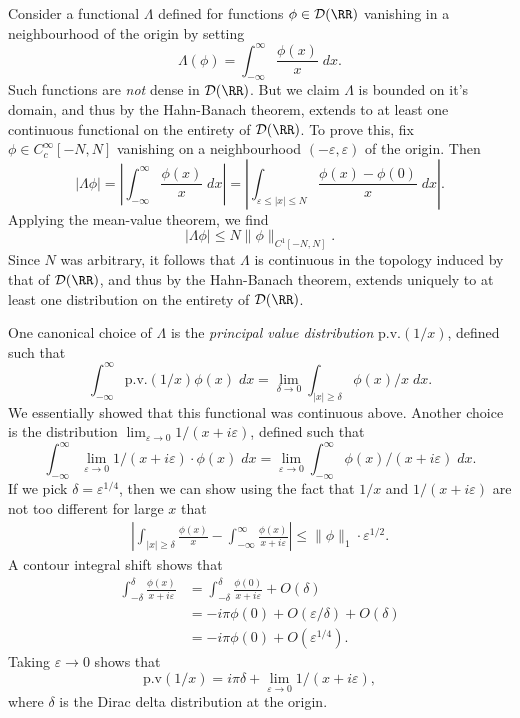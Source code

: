 \begin{example}
    Consider a functional $\Lambda$ defined for functions $\phi \in \mathcal{D}(\RR)$ vanishing in a neighbourhood of the origin by setting
    \[ \Lambda(\phi) = \int_{-\infty}^\infty \frac{\phi(x)}{x}\; dx. \]
    Such functions are \emph{not} dense in $\mathcal{D}(\RR)$. But we claim $\Lambda$ is bounded on it's domain, and thus by the Hahn-Banach theorem, extends to at least one continuous functional on the entirety of $\mathcal{D}(\RR)$. To prove this, fix $\phi \in C_c^\infty[-N,N]$ vanishing on a neighbourhood $(-\varepsilon,\varepsilon)$ of the origin. Then
    \[ |\Lambda \phi| = \left| \int_{-\infty}^\infty \frac{\phi(x)}{x}\; dx \right| = \left| \int_{\varepsilon \leq |x| \leq N} \frac{\phi(x) - \phi(0)}{x}\; dx \right|. \]
    Applying the mean-value theorem, we find
    \[ |\Lambda \phi| \leq N \| \phi \|_{C^1[-N,N]}. \]
    Since $N$ was arbitrary, it follows that $\Lambda$ is continuous in the topology induced by that of $\mathcal{D}(\RR)$, and thus by the Hahn-Banach theorem, extends uniquely to at least one distribution on the entirety of $\mathcal{D}(\RR)$.

    One canonical choice of $\Lambda$ is the \emph{principal value distribution} $\text{p.v.}(1/x)$, defined such that
    \[ \int_{-\infty}^\infty \text{p.v.}(1/x) \phi(x)\; dx = \lim_{\delta \to 0} \int_{|x| \geq \delta} \phi(x) / x\; dx. \]
    We essentially showed that this functional was continuous above. Another choice is the distribution $\lim_{\varepsilon \to 0} 1/(x + i \varepsilon)$, defined such that
    \[ \int_{-\infty}^\infty \lim_{\varepsilon \to 0} 1/(x + i \varepsilon) \cdot \phi(x)\; dx = \lim_{\varepsilon \to 0} \int_{-\infty}^\infty \phi(x) / (x + i \varepsilon)\; dx. \]
    If we pick $\delta = \varepsilon^{1/4}$, then we can show using the fact that $1/x$ and $1/(x + i \varepsilon)$ are not too different for large $x$ that
    \begin{align*}
        \left| \int_{|x| \geq \delta} \frac{\phi(x)}{x} - \int_{-\infty}^\infty \frac{\phi(x)}{x + i\varepsilon} \right| \leq \| \phi \|_1 \cdot \varepsilon^{1/2}.
    \end{align*}
    A contour integral shift shows that
    \begin{align*}
        \int_{-\delta}^\delta \frac{\phi(x)}{x + i\varepsilon} &= \int_{-\delta}^\delta \frac{\phi(0)}{x + i \varepsilon} + O(\delta)\\
        &= -i \pi \phi(0) + O(\varepsilon / \delta) + O(\delta)\\
        &= -i \pi \phi(0) + O(\varepsilon^{1/4}).
    \end{align*}
    Taking $\varepsilon \to 0$ shows that
    \[ \text{p.v}(1/x) = i \pi \delta + \lim_{\varepsilon \to 0} 1/(x + i \varepsilon), \]
    where $\delta$ is the Dirac delta distribution at the origin.


\end{example}
